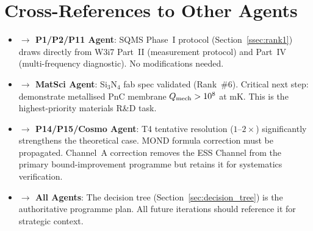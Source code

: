\documentclass[11pt]{article}
\newcommand{\Qmech}{Q_{\rm mech}}
\theoremstyle{definition}
\theoremstyle{remark}
\begin{document}
\section{Cross-References to Other Agents}
\label{sec:crossrefs}

\begin{itemize}[nosep]
\item \textbf{$\to$ P1/P2/P11 Agent}: SQMS Phase~I protocol
  (Section~\ref{ssec:rank1}) draws directly from W3i7
  Part~II (measurement protocol) and Part~IV (multi-frequency
  diagnostic). No modifications needed.
\item \textbf{$\to$ MatSci Agent}: Si$_3$N$_4$ fab spec validated
  (Rank~\#6). Critical next step: demonstrate metallised PnC membrane
  $\Qmech > 10^8$ at mK. This is the highest-priority materials
  R\&D task.
\item \textbf{$\to$ P14/P15/Cosmo Agent}: T4 tentative resolution
  ($1$--$2\times$) significantly strengthens the theoretical case.
  MOND formula correction must be propagated. Channel~A correction
  removes the ESS Channel from the primary bound-improvement
  programme but retains it for systematics verification.
\item \textbf{$\to$ All Agents}: The decision tree
  (Section~\ref{sec:decision_tree}) is the authoritative programme plan.
  All future iterations should reference it for strategic context.
\end{itemize}
\end{document}
